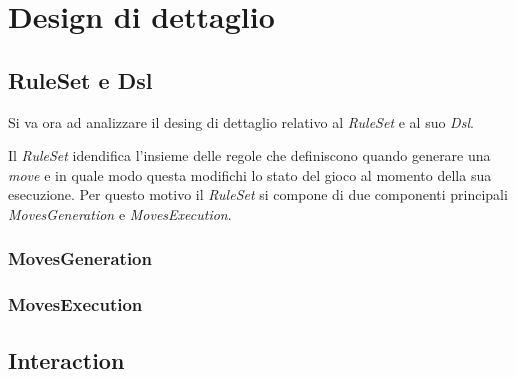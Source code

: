 \section{Design di dettaglio}



\subsection{RuleSet e Dsl}

Si va ora ad analizzare il desing di dettaglio relativo al \textit{RuleSet} e al suo \textit{Dsl}.

Il \textit{RuleSet} idendifica l'insieme delle regole che definiscono quando generare una \textit{move} e in quale modo questa modifichi lo stato del gioco al momento della sua esecuzione.
%
Per questo motivo il \textit{RuleSet} si compone di due componenti principali \textit{MovesGeneration} e \textit{MovesExecution}.

\subsubsection{MovesGeneration}

\subsubsection{MovesExecution}

\subsection{Interaction}


